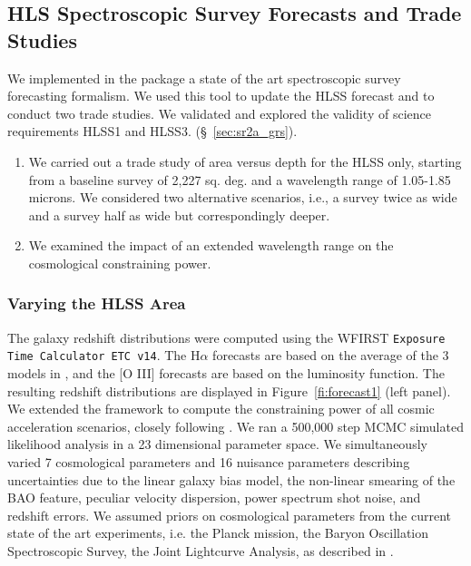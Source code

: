 \subsection{HLS Spectroscopic Survey Forecasts and Trade Studies}

\begin{summaryii}
  We implemented in the \CoLi package a state of the art spectroscopic survey forecasting formalism. We used this tool to update the HLSS forecast and to conduct two trade studies. We validated and explored the validity of science requirements HLSS1 and HLSS3. (\S~\ref{sec:sr2a_grs}).
  \begin{enumerate}
  \item We carried out a trade study of area versus depth for the HLSS only, starting from a baseline survey of 2,227 sq. deg. and a wavelength range of 1.05-1.85 microns. We considered two alternative scenarios, i.e., a survey twice as wide and a survey half as wide but correspondingly deeper.
  \item We examined the impact of an extended wavelength range on the cosmological constraining power.
\end{enumerate}
\end{summaryii}

\subsubsection{Varying the HLSS Area} The galaxy redshift distributions were computed using the WFIRST \texttt{Exposure Time Calculator ETC v14}. The H$\alpha$ forecasts are based on the
average of the 3 models in \citet{Pozzetti:2016}, and the [O III] forecasts are
based on the \citet{Mehta:2015} luminosity function. The resulting redshift
distributions are displayed in Figure~\ref{fi:forecast1} (left panel). We extended the \CoLi framework \citep{Eifler:2014,Krause2017} to compute the constraining power of all cosmic acceleration scenarios, closely following \citet{Wang2013}. We ran a
500,000 step MCMC simulated likelihood analysis in a 23 dimensional parameter
space. We simultaneously varied 7 cosmological parameters and 16 nuisance
parameters describing uncertainties due to the linear galaxy bias model, the
non-linear smearing of the BAO feature, peculiar velocity dispersion, power
spectrum shot noise, and redshift errors. We assumed priors on cosmological
parameters from the current state of the art experiments, i.e. the Planck
mission, the Baryon Oscillation Spectroscopic Survey, the Joint Lightcurve
Analysis, as described in \citet{Aubourg:2015}.

